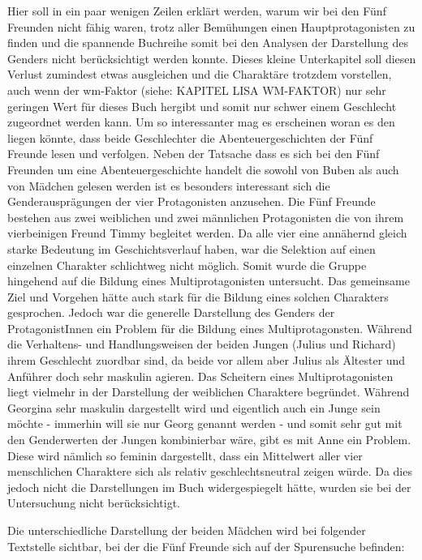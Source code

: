 Hier soll in ein paar wenigen Zeilen erklärt werden, warum wir bei den
Fünf Freunden nicht fähig waren, trotz aller Bemühungen einen
Hauptprotagonisten zu finden und die spannende Buchreihe somit bei den
Analysen der Darstellung des Genders nicht berücksichtigt werden konnte.
Dieses kleine Unterkapitel soll diesen Verlust zumindest etwas
ausgleichen und die Charaktäre trotzdem vorstellen, auch wenn der
wm-Faktor (siehe: KAPITEL LISA WM-FAKTOR) nur sehr geringen Wert für
dieses Buch hergibt und somit nur schwer einem Geschlecht zugeordnet
werden kann. Um so interessanter mag es erscheinen woran es den liegen
könnte, dass beide Geschlechter die Abenteuergeschichten der Fünf
Freunde lesen und verfolgen. Neben der Tatsache dass es sich bei den
Fünf Freunden um eine Abenteuergeschichte handelt die sowohl von Buben
als auch von Mädchen gelesen werden ist es besonders interessant sich
die Genderausprägungen der vier Protagonisten anzusehen. Die Fünf
Freunde bestehen aus zwei weiblichen und zwei männlichen Protagonisten
die von ihrem vierbeinigen Freund Timmy begleitet werden. Da alle vier
eine annähernd gleich starke Bedeutung im Geschichtsverlauf haben, war
die Selektion auf einen einzelnen Charakter schlichtweg nicht möglich.
Somit wurde die Gruppe hingehend auf die Bildung eines
Multiprotagonisten untersucht. Das gemeinsame Ziel und Vorgehen hätte
auch stark für die Bildung eines solchen Charakters gesprochen. Jedoch
war die generelle Darstellung des Genders der ProtagonistInnen ein
Problem für die Bildung eines Multiprotagonsten. Während die Verhaltens-
und Handlungsweisen der beiden Jungen (Julius und Richard) ihrem
Geschlecht zuordbar sind, da beide vor allem aber Julius als Ältester
und Anführer doch sehr maskulin agieren. Das Scheitern eines
Multiprotagonisten liegt vielmehr in der Darstellung der weiblichen
Charaktere begründet. Während Georgina sehr maskulin dargestellt wird
und eigentlich auch ein Junge sein möchte - immerhin will sie nur Georg
genannt werden - und somit sehr gut mit den Genderwerten der Jungen
kombinierbar wäre, gibt es mit Anne ein Problem. Diese wird nämlich so
feminin dargestellt, dass ein Mittelwert aller vier menschlichen
Charaktere sich als relativ geschlechtsneutral zeigen würde. Da dies
jedoch nicht die Darstellungen im Buch widergespiegelt hätte, wurden sie
bei der Untersuchung nicht berücksichtigt.

Die unterschiedliche Darstellung der beiden Mädchen wird bei folgender
Textstelle sichtbar, bei der die Fünf Freunde sich auf der Spurensuche
befinden:

